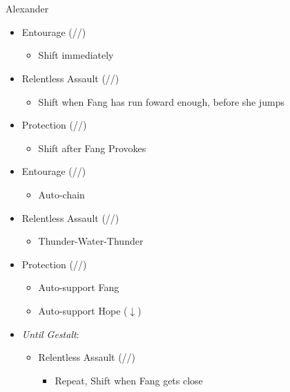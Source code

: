 \chapter[Chapter 11]{}

\renewcommand{\first}{[1] Entourage (\rav/\med/\sen)}
\renewcommand{\second}{[2] Protection (\syn/\med/\sen)}
\renewcommand{\third}{[3] }
\renewcommand{\fourth}{[4] }
\renewcommand{\fifth}{[5] }
\renewcommand{\sixth}{[6] Relentless Assault (\rav/\rav/\com)}
\begin{battle}{Alexander}
\begin{itemize}
    \item \first
    \begin{itemize}
        \item Shift immediately
    \end{itemize}
    \item \sixth
    \begin{itemize}
        \item Shift when Fang  has run foward enough, before she jumps
    \end{itemize}
    \item \second
    \begin{itemize}
        \item Shift after Fang Provokes
    \end{itemize}
    \item \first
    \begin{itemize}
        \item Auto-chain
    \end{itemize}
    \item \sixth
    \begin{itemize}
        \item Thunder-Water-Thunder
    \end{itemize}
    \item \second
    \begin{itemize}
        \item Auto-support Fang
        \item Auto-support Hope ($\downarrow$)
    \end{itemize}
    \item \textit{Until Gestalt}:
    \begin{itemize}
        \item \begin{flushleft}\sixth\end{flushleft}
        \begin{itemize}
            \item Repeat, Shift when Fang gets close

\end{itemize}
\end{itemize}
\end{itemize}
\end{battle}
